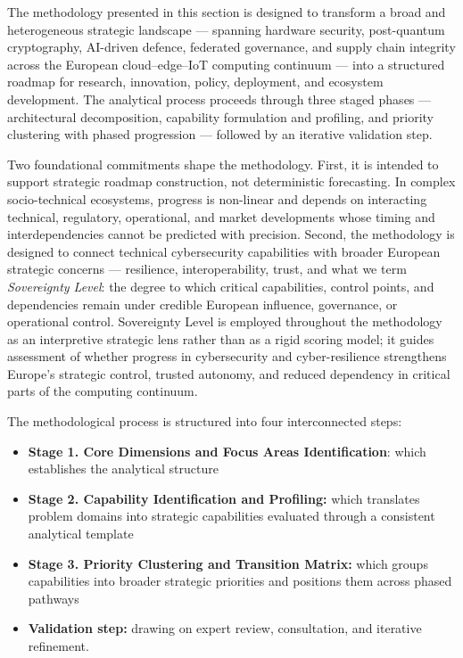 \documentclass{ieeeaccess}
\begin{document}
The methodology presented in this section is designed to transform a
broad and heterogeneous strategic landscape --- spanning hardware
security, post-quantum cryptography, AI-driven defence, federated
governance, and supply chain integrity across the European
cloud--edge--IoT computing continuum --- into a structured roadmap for
research, innovation, policy, deployment, and ecosystem development. The
analytical process proceeds through three staged phases ---
architectural decomposition, capability formulation and profiling, and
priority clustering with phased progression --- followed by an iterative
validation step.

Two foundational commitments shape the methodology. First, it is
intended to support strategic roadmap construction, not deterministic
forecasting. In complex socio-technical ecosystems, progress is
non-linear and depends on interacting technical, regulatory,
operational, and market developments whose timing and interdependencies
cannot be predicted with precision. Second, the methodology is designed
to connect technical cybersecurity capabilities with broader European
strategic concerns --- resilience, interoperability, trust, and what we
term \emph{Sovereignty Level}: the degree to which critical
capabilities, control points, and dependencies remain under credible
European influence, governance, or operational control. Sovereignty
Level is employed throughout the methodology as an interpretive
strategic lens rather than as a rigid scoring model; it guides
assessment of whether progress in cybersecurity and cyber-resilience
strengthens Europe's strategic control, trusted autonomy, and reduced
dependency in critical parts of the computing continuum.

The methodological process is structured into four interconnected steps:

\begin{itemize}
\item
  \textbf{Stage 1. Core Dimensions and Focus Areas Identification}:
  which establishes the analytical structure
\item
  \textbf{Stage 2. Capability Identification and Profiling:} which
  translates problem domains into strategic capabilities evaluated
  through a consistent analytical template
\item
  \textbf{Stage 3. Priority Clustering and Transition Matrix:} which
  groups capabilities into broader strategic priorities and positions
  them across phased pathways
\item
  \textbf{Validation step:} drawing on expert review, consultation,
  and iterative refinement.
\end{itemize}
\end{document}
